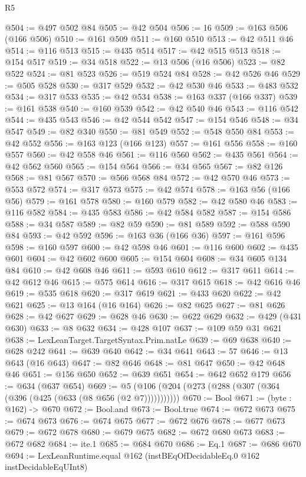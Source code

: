\begin{lexlean}{R5}
\begin{coremodule}
@504 := @497 @502 @84
@505 := @42 @504
@506 := 16
@509 := @163 @506 (@166 @506)
@510 := @161 @509
@511 := @160 @510
@513 := @42 @511 @46
@514 := @116 @513
@515 := @435 @514
@517 := @42 @515 @513
@518 := @154 @517
@519 := @34 @518
@522 := @13 @506 (@16 @506)
@523 := @82 @522
@524 := @81 @523
@526 := @519 @524 @84
@528 := @42 @526 @46
@529 := @505 @528
@530 := @317 @529
@532 := @42 @530 @46
@533 := @483 @532
@534 := @317 @533
@535 := @42 @534
@538 := @163 @337 (@166 @337)
@539 := @161 @538
@540 := @160 @539
@542 := @42 @540 @46
@543 := @116 @542
@544 := @435 @543
@546 := @42 @544 @542
@547 := @154 @546
@548 := @34 @547
@549 := @82 @340
@550 := @81 @549
@552 := @548 @550 @84
@553 := @42 @552
@556 := @163 @123 (@166 @123)
@557 := @161 @556
@558 := @160 @557
@560 := @42 @558 @46
@561 := @116 @560
@562 := @435 @561
@564 := @42 @562 @560
@565 := @154 @564
@566 := @34 @565
@567 := @82 @126
@568 := @81 @567
@570 := @566 @568 @84
@572 := @42 @570 @46
@573 := @553 @572
@574 := @317 @573
@575 := @42 @574
@578 := @163 @56 (@166 @56)
@579 := @161 @578
@580 := @160 @579
@582 := @42 @580 @46
@583 := @116 @582
@584 := @435 @583
@586 := @42 @584 @582
@587 := @154 @586
@588 := @34 @587
@589 := @82 @59
@590 := @81 @589
@592 := @588 @590 @84
@593 := @42 @592
@596 := @163 @36 (@166 @36)
@597 := @161 @596
@598 := @160 @597
@600 := @42 @598 @46
@601 := @116 @600
@602 := @435 @601
@604 := @42 @602 @600
@605 := @154 @604
@608 := @34 @605 @134 @84
@610 := @42 @608 @46
@611 := @593 @610
@612 := @317 @611
@614 := @42 @612 @46
@615 := @575 @614
@616 := @317 @615
@618 := @42 @616 @46
@619 := @535 @618
@620 := @317 @619
@621 := @433 @620
@622 := @42 @621
@625 := @13 @164 (@16 @164)
@626 := @82 @625
@627 := @81 @626
@628 := @42 @627
@629 := @628 @46
@630 := @622 @629
@632 := @429 (@431 @630)
@633 := @8 @632
@634 := @428 @107
@637 := @109 @59 @31 @621
@638 := LexLeanTarget.TargetSyntax.Prim.natLe
@639 := @69 @638
@640 := @628 @242
@641 := @639 @640
@642 := @34 @641
@643 := 57
@646 := @13 @643 (@16 @643)
@647 := @82 @646
@648 := @81 @647
@650 := @42 @648 @46
@651 := @156 @650
@652 := @639 @651
@654 := @642 @652 @179
@656 := @634 (@637 @654)
@669 := @5 (@106 (@204 (@273 (@288 (@307 (@364 (@396 (@425 (@633 (@8 @656 (@2 @7)))))))))))
@670 := Bool
@671 := (byte : @162) -> @670
@672 := Bool.and
@673 := Bool.true
@674 := @672 @673
@675 := @674 @673
@676 := @674 @675
@677 := @672 @676
@678 := @677 @673
@679 := @672 @678
@680 := @679 @675
@682 := @672 @680 @673
@683 := @672 @682
@684 := ite.{1}
@685 := @684 @670
@686 := Eq.{1}
@687 := @686 @670
@694 := LexLeanRuntime.equal @162 (instBEqOfDecidableEq.{0} @162 instDecidableEqUInt8)

\end{coremodule}
\end{lexlean}
